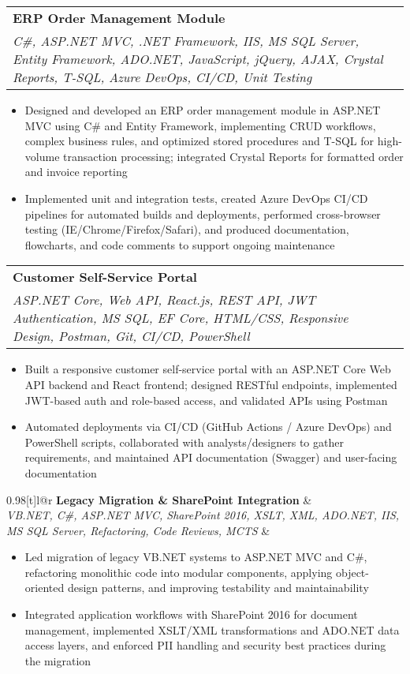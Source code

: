 \documentclass[a4paper,10pt]{article}
\makeatletter
\newcommand{\resumeProject}[4]{
\vspace{0.5mm}\item
    \begin{tabular*}{0.98\textwidth}[t]{l@{\extracolsep{\fill}}r}
        \textbf{#1} & \textit{\footnotesize{#3}} \\
        \footnotesize{\textit{#2}} & \footnotesize{#4}
    \end{tabular*}
    \vspace{-2.4mm}
}
\newcommand{\resumeItemListStart}{\begin{itemize}[leftmargin=*,labelsep=1mm,itemsep=0.5mm]}
\newcommand{\resumeItemListEnd}{\end{itemize}\vspace{-2mm}}
\makeatother
\begin{document}
\resumeProject
  {ERP Order Management Module}
  {C\#, ASP.NET MVC, .NET Framework, IIS, MS SQL Server, Entity Framework, ADO.NET, JavaScript, jQuery, AJAX, Crystal Reports, T-SQL, Azure DevOps, CI/CD, Unit Testing}
  {}
  {}
\resumeItemListStart
  \item Designed and developed an ERP order management module in ASP.NET MVC using C\# and Entity Framework, implementing CRUD workflows, complex business rules, and optimized stored procedures and T-SQL for high-volume transaction processing; integrated Crystal Reports for formatted order and invoice reporting
  \item Implemented unit and integration tests, created Azure DevOps CI/CD pipelines for automated builds and deployments, performed cross-browser testing (IE/Chrome/Firefox/Safari), and produced documentation, flowcharts, and code comments to support ongoing maintenance
\resumeItemListEnd

\resumeProject
  {Customer Self-Service Portal}
  {ASP.NET Core, Web API, React.js, REST API, JWT Authentication, MS SQL, EF Core, HTML/CSS, Responsive Design, Postman, Git, CI/CD, PowerShell}
  {}
  {}
\resumeItemListStart
  \item Built a responsive customer self-service portal with an ASP.NET Core Web API backend and React frontend; designed RESTful endpoints, implemented JWT-based auth and role-based access, and validated APIs using Postman
  \item Automated deployments via CI/CD (GitHub Actions / Azure DevOps) and PowerShell scripts, collaborated with analysts/designers to gather requirements, and maintained API documentation (Swagger) and user-facing documentation
\resumeItemListEnd

\resumeProject
  {Legacy Migration & SharePoint Integration}
  {VB.NET, C\#, ASP.NET MVC, SharePoint 2016, XSLT, XML, ADO.NET, IIS, MS SQL Server, Refactoring, Code Reviews, MCTS}
  {}
  {}
\resumeItemListStart
  \item Led migration of legacy VB.NET systems to ASP.NET MVC and C\#, refactoring monolithic code into modular components, applying object-oriented design patterns, and improving testability and maintainability
  \item Integrated application workflows with SharePoint 2016 for document management, implemented XSLT/XML transformations and ADO.NET data access layers, and enforced PII handling and security best practices during the migration
\resumeItemListEnd
\end{document}
